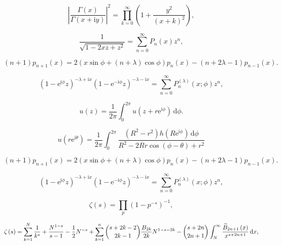 
\[\left|\frac{\Gamma\left(x\right)}{\Gamma\left(x+\mathrm{i}y\right)}\right|^{2}%
=\prod_{k=0}^{\infty}\left(1+\frac{y^{2}}{(x+k)^{2}}\right),\]

\[\frac{1}{\sqrt{1-2xz+z^{2}}}=\sum_{n=0}^{\infty}P_{n}\left(x\right)z^{n},\]

\[(n+1)p_{n+1}(x)=2\left(x\sin\phi+(n+\lambda)\cos\phi\right)p_{n}(x)-(n+2%
\lambda-1)p_{n-1}(x).\]

\[(1-{\mathrm{e}}^{\mathrm{i}\phi}z)^{-\lambda+\mathrm{i}x}(1-{\mathrm{e}}^{-%
\mathrm{i}\phi}z)^{-\lambda-\mathrm{i}x}=\sum_{n=0}^{\infty}P^{(\lambda)}_{n}%
\left(x;\phi\right)z^{n},\]

\[u(z)=\frac{1}{2\pi}\int^{2\pi}_{0}u(z+r{\mathrm{e}}^{\mathrm{i}\phi})\,\mathrm%
{d}\phi.\]

\[u(r{\mathrm{e}}^{\mathrm{i}\theta})=\frac{1}{2\pi}\int^{2\pi}_{0}\frac{(R^{2}-%
r^{2})h(R{\mathrm{e}}^{\mathrm{i}\phi})\,\mathrm{d}\phi}{R^{2}-2Rr\cos\left(%
\phi-\theta\right)+r^{2}}\]

\[(n+1)p_{n+1}(x)=2\left(x\sin\phi+(n+\lambda)\cos\phi\right)p_{n}(x)-(n+2%
\lambda-1)p_{n-1}(x).\]

\[(1-{\mathrm{e}}^{\mathrm{i}\phi}z)^{-\lambda+\mathrm{i}x}(1-{\mathrm{e}}^{-%
\mathrm{i}\phi}z)^{-\lambda-\mathrm{i}x}=\sum_{n=0}^{\infty}P^{(\lambda)}_{n}%
\left(x;\phi\right)z^{n},\]

\[\zeta\left(s\right)=\prod_{p}(1-p^{-s})^{-1},\]

\[\zeta\left(s\right)=\sum_{k=1}^{N}\frac{1}{k^{s}}+\frac{N^{1-s}}{s-1}-\frac{1}%
{2}N^{-s}+\sum_{k=1}^{n}\genfrac{(}{)}{0.0pt}{}{s+2k-2}{2k-1}\frac{B_{2k}}{2k}%
N^{1-s-2k}-\genfrac{(}{)}{0.0pt}{}{s+2n}{2n+1}\int_{N}^{\infty}\frac{%
\widetilde{B}_{2n+1}\left(x\right)}{x^{s+2n+1}}\,\mathrm{d}x,\]

